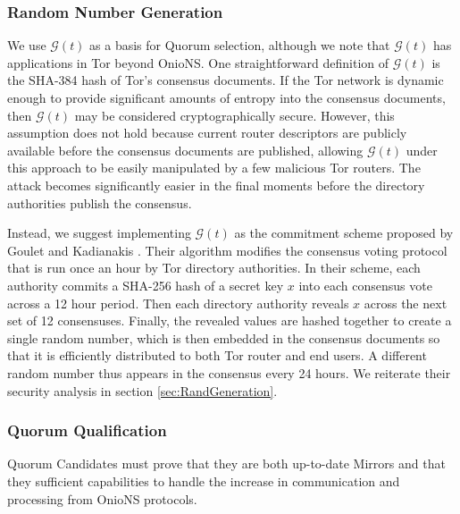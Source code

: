 \documentclass[conference]{IEEEtran}
\begin{document}
\subsubsection{Random Number Generation}

We use $ \mathcal{G}(t) $ as a basis for Quorum selection, although we note that $ \mathcal{G}(t) $ has applications in Tor beyond OnioNS. One straightforward definition of $ \mathcal{G}(t) $ is the SHA-384 hash of Tor's consensus documents. If the Tor network is dynamic enough to provide significant amounts of entropy into the consensus documents, then $ \mathcal{G}(t) $ may be considered cryptographically secure. However, this assumption does not hold because current router descriptors are publicly available before the consensus documents are published, allowing $ \mathcal{G}(t) $ under this approach to be easily manipulated by a few malicious Tor routers. The attack becomes significantly easier in the final moments before the directory authorities publish the consensus.

Instead, we suggest implementing $ \mathcal{G}(t) $ as the commitment scheme proposed by Goulet and Kadianakis \cite{GouletCommitReveal}. Their algorithm modifies the consensus voting protocol that is run once an hour by Tor directory authorities. In their scheme, each authority commits a SHA-256 hash of a secret key $ x $ into each consensus vote across a 12 hour period. Then each directory authority reveals $ x $ across the next set of 12 consensuses. Finally, the revealed values are hashed together to create a single random number, which is then embedded in the consensus documents so that it is efficiently distributed to both Tor router and end users. A different random number thus appears in the consensus every 24 hours. We reiterate their security analysis in section \ref{sec:RandGeneration}.

\subsubsection{Quorum Qualification}

Quorum Candidates must prove that they are both up-to-date Mirrors and that they sufficient capabilities to handle the increase in communication and processing from OnioNS protocols.
\end{document}
